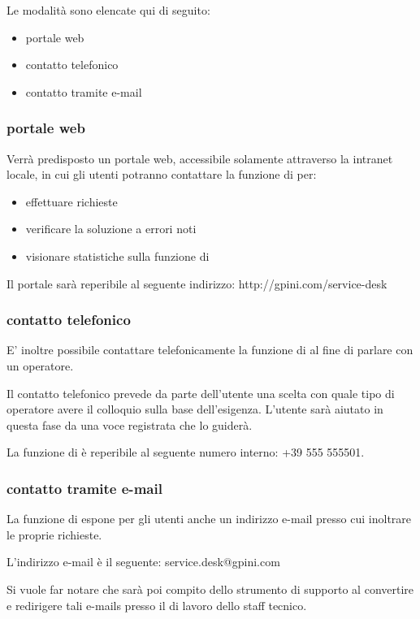 Le modalità sono elencate qui di seguito:

\begin{itemize}
\item{portale web}
\item{contatto telefonico}
\item{contatto tramite e-mail}
\end{itemize}

\subsubsection[Portale Web]{portale web}
Verrà predisposto un portale web, accessibile solamente attraverso la intranet locale, in cui gli utenti potranno contattare la funzione di  per:

\begin{itemize}
\item{effettuare richieste}
\item{verificare la soluzione a errori noti}
\item{visionare statistiche sulla funzione di }
\end{itemize}

Il portale sarà reperibile al seguente indirizzo: http://gpini.com/service-desk

\subsubsection[Contatto telefonico]{contatto telefonico}
E' inoltre possibile contattare telefonicamente la funzione di  al fine di parlare con un operatore. 

Il contatto telefonico prevede da parte dell'utente una scelta con quale tipo di operatore avere il colloquio sulla base dell'esigenza. L'utente sarà aiutato in questa fase da una voce registrata che lo guiderà.

La funzione di  è reperibile al seguente numero interno: +39 555 555501.

\subsubsection[Contatto tramite e-mail]{contatto tramite e-mail}
La funzione di  espone per gli utenti anche un indirizzo e-mail presso cui inoltrare le proprie richieste.

L'indirizzo e-mail è il seguente: service.desk@gpini.com

Si vuole far notare che sarà poi compito dello strumento di supporto al  convertire e redirigere tali e-mails presso il  di lavoro dello staff tecnico.